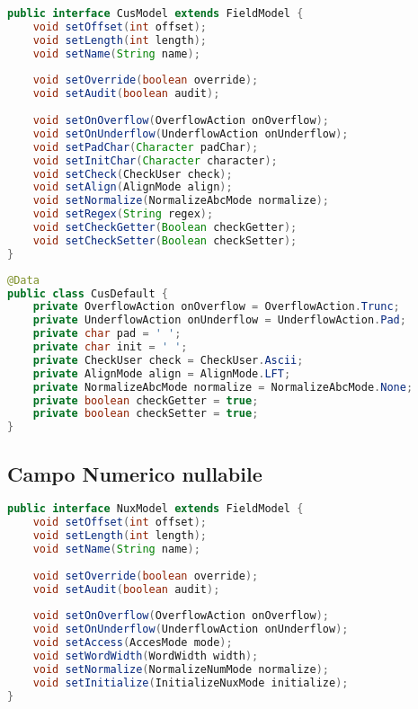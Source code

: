 \documentclass[a4paper,10pt]{report}
\begin{document}
\begin{lstlisting}[language=java, caption=interfaccia CusModel, 
label=code:CusModel]
public interface CusModel extends FieldModel {
    void setOffset(int offset);
    void setLength(int length);
    void setName(String name);
    
    void setOverride(boolean override);
    void setAudit(boolean audit);
    
    void setOnOverflow(OverflowAction onOverflow);
    void setOnUnderflow(UnderflowAction onUnderflow);
    void setPadChar(Character padChar);
    void setInitChar(Character character);
    void setCheck(CheckUser check);
    void setAlign(AlignMode align);
    void setNormalize(NormalizeAbcMode normalize);
    void setRegex(String regex);
    void setCheckGetter(Boolean checkGetter);
    void setCheckSetter(Boolean checkSetter);
}
\end{lstlisting}

\begin{lstlisting}[language=java, caption=class CusDefault, 
label=code:CusDefault]
@Data
public class CusDefault {
    private OverflowAction onOverflow = OverflowAction.Trunc;
    private UnderflowAction onUnderflow = UnderflowAction.Pad;
    private char pad = ' ';
    private char init = ' ';
    private CheckUser check = CheckUser.Ascii;
    private AlignMode align = AlignMode.LFT;
    private NormalizeAbcMode normalize = NormalizeAbcMode.None;
    private boolean checkGetter = true;
    private boolean checkSetter = true;
}
\end{lstlisting}

\subsection{Campo Numerico nullabile}

\begin{lstlisting}[language=java, caption=interfaccia NuxModel, 
label=code:NuxModel]
public interface NuxModel extends FieldModel {
    void setOffset(int offset);
    void setLength(int length);
    void setName(String name);
    
    void setOverride(boolean override);
    void setAudit(boolean audit);
    
    void setOnOverflow(OverflowAction onOverflow);
    void setOnUnderflow(UnderflowAction onUnderflow);
    void setAccess(AccesMode mode);
    void setWordWidth(WordWidth width);
    void setNormalize(NormalizeNumMode normalize);
    void setInitialize(InitializeNuxMode initialize);
}
\end{lstlisting}
\end{document}

